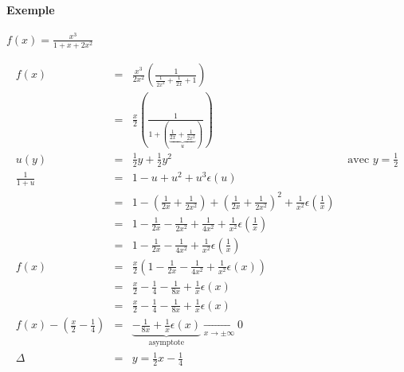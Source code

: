 \paragraph{Exemple} $f(x) = \frac{x^3}{1+x+2x^2}$

\[\begin{array}{rclr}
f(x) &=& \frac{x^3}{2x^2}(\frac{1}{\frac{1}{2x^2} + \frac{1}{2x}+1}) \\
	&=& \frac{x}{2}(\frac{1}{1+(\underbrace{\frac{1}{2x}+\frac{1}{2x^2}}_{u})}) \\
u(y) &=& \frac{1}{2}y + \frac{1}{2}y^2 & \text{ avec } y = \frac{1}{2} \\
\frac{1}{1+u} &=& 1-u+u^2+u^3 \epsilon (u) \\
&=& 1 - (\frac{1}{2x} + \frac{1}{2x^2}) + (\frac{1}{2x} + \frac{1}{2x^2})^2 +  \frac{1}{x^2}\epsilon(\frac{1}{x}) \\
&=& 1 - \frac{1}{2x} - \frac{1}{2x^2} + \frac{1}{4x^2} + \frac{1}{x^2}\epsilon(\frac{1}{x}) \\
&=& 1 - \frac{1}{2x} - \frac{1}{4x^2} + \frac{1}{x^2} \epsilon (\frac{1}{x})
\\
f(x) &=& \frac{x}{2}(1-\frac{1}{2x}-\frac{1}{4x^2}+\frac{1}{x^2}\epsilon (x)) \\
&=& \frac{x}{2} - \frac{1}{4} - \frac{1}{8x} + \frac{1}{x}\epsilon (x) \\
&=& \frac{x}{2} - \frac{1}{4} - \frac{1}{8x} + \frac{1}{x}\epsilon (x) \\
f(x) - (\frac{x}{2}-\frac{1}{4}) &=& \underbrace{-\frac{1}{8x} +  \frac{1}{x}\epsilon (x) }_{\text{asymptote}} \xrightarrow[x \to \pm \infty]{} 0 \\
\Delta &=& y = \frac{1}{2}x - \frac{1}{4}
\end{array}\]

